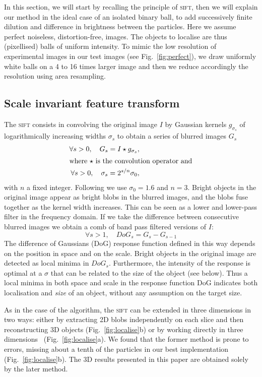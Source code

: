 \documentclass[8.5pt,twoside,twocolumn]{article}
\begin{document}
In this section, we will start by recalling the principle of \textsc{sift}, then we will explain our method in the ideal case of an isolated binary ball, to add successively finite dilution and difference in brightness between the particles. Here we assume perfect noiseless, distortion-free, images. The objects to localise are thus (pixellised) balls of uniform intensity. To mimic the low resolution of experimental images in our test images (see Fig.~\ref{fig:perfect}), we draw uniformly white balls on a 4 to 16 times larger image and then we reduce accordingly the resolution using area resampling.

\subsection*{Scale invariant feature transform}
The \textsc{sift} consists in convolving the original image $I$ by Gaussian kernels $g_{\sigma_s}$ of logarithmically increasing widths $\sigma_s$ to obtain a series of blurred images $G_s$
\begin{align}
\forall s>0,\quad G_s = I \star g_{\sigma_s}, \label{eq:gaussian_blur}\\
\intertext{where $\star$ is the convolution operator and}
\forall s>0,\quad \sigma_{s} = 2^{s/n} \sigma_0 ,
\label{eq:sigma_s}
\end{align}
with $n$ a fixed integer. Following \cite{Lowe2004} we use $\sigma_0=1.6$ and $n=3$. Bright objects in the original image appear as bright blobs in the blurred images, and the blobs fuse together as the kernel width increases. This can be seen as a lower and lower-pass filter in the frequency domain. If we take the difference between consecutive blurred images we obtain a comb of band pass filtered versions of $I$: 
\begin{equation}
\forall s>1,\quad DoG_s = G_s - G_{s-1} \label{eq:DoG_s}
\end{equation}
The difference of Gaussians (DoG) response function defined in this way depends on the position in space and on the scale. Bright objects in the original image are detected as local minima in $DoG_s$. Furthermore, the intensity of the response is optimal at a $\sigma$ that can be related to the size of the object (see below). Thus a local minima in both space and scale in the response function DoG indicates both localisation and \emph{size} of an object, without any assumption on the target size.

As in the case of the \citet{Crocker1996} algorithm, the \textsc{sift} can be extended in three dimensions in two ways: either by extracting 2D blobs independently on each slice and then reconstructing 3D objects (Fig.~\ref{fig:localise}b) or by working directly in three dimensions~\cite{Urschler2006, Cheung2009} (Fig.~\ref{fig:localise}a). We found that the former method is prone to errors, missing about a tenth of the particles in our best implementation (Fig.~\ref{fig:localise}b). The 3D results presented in this paper are obtained solely by the later method.
\end{document}
